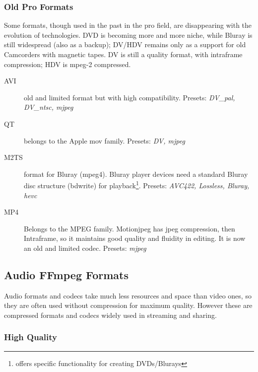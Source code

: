 \subsubsection{Old Pro Formats}
\label{ssub:ffmpeg_old_pro_formats}

Some formats, though used in the past in the pro field, are disappearing with the evolution of technologies. DVD is becoming more and more niche, while Bluray is still widespread (also as a backup); DV/HDV remains only as a support for old Camcorders with magnetic tapes. DV is still a quality format, with intraframe compression; HDV is mpeg-2 compressed.

\begin{description}
	\item[AVI] old and limited format but with high compatibility.
	\newline    Presets: \textit{DV\_pal, DV\_ntsc, mjpeg}
	\item[QT] belongs to the Apple mov family.
	\newline    Presets: \textit{DV, mjpeg}
	\item[M2TS] format for Bluray (mpeg4). Bluray player devices need a standard Bluray disc structure (bdwrite) for playback\protect\footnote{\CGG{} offers specific functionality for creating DVDs/Blurays}.
	\newline    Presets: \textit{AVC422, Lossless, Bluray, hevc}
	\item[MP4] Belongs to the MPEG family. Motionjpeg has jpeg compression, then Intraframe, so it maintains good quality and fluidity in editing. It is now an old and limited codec.
	\newline    Presets: \textit{mjpeg}
\end{description}

\subsection{Audio FFmpeg Formats}%
\label{sub:FFmpeg_audio}

Audio formats and codecs take much less resources and space than video ones, so they are often used without compression for maximum quality. However these are compressed formats and codecs widely used in streaming and sharing.

\subsubsection{High Quality}
\label{ssub:ffmpeg_audio_high_quality}

